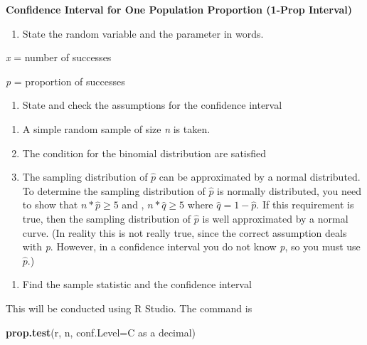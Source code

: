 \documentclass[
]{book}
\newenvironment{Shaded}{\begin{snugshade}}{\end{snugshade}}
\newcommand{\DataTypeTok}[1]{\textcolor[rgb]{0.13,0.29,0.53}{#1}}
\newcommand{\KeywordTok}[1]{\textcolor[rgb]{0.13,0.29,0.53}{\textbf{#1}}}
\newcommand{\NormalTok}[1]{#1}
\providecommand{\tightlist}{%
  \setlength{\itemsep}{0pt}\setlength{\parskip}{0pt}}
\begin{document}
\textbf{Confidence Interval for One Population Proportion (1-Prop Interval)}

\begin{enumerate}
\def\labelenumi{\arabic{enumi}.}
\tightlist
\item
  State the random variable and the parameter in words.
\end{enumerate}

\emph{x} = number of successes

\emph{p} = proportion of successes

\begin{enumerate}
\def\labelenumi{\arabic{enumi}.}
\setcounter{enumi}{1}
\tightlist
\item
  State and check the assumptions for the confidence interval
\end{enumerate}

\begin{enumerate}
\def\labelenumi{\alph{enumi}.}
\item
  A simple random sample of size \emph{n} is taken.
\item
  The condition for the binomial distribution are satisfied
\item
  The sampling distribution of \(\hat{p}\) can be approximated by a normal distributed. To determine the sampling distribution of \(\hat{p}\) is normally distributed, you need to show that \(n*\hat{p}\ge5\) and , \(n*\hat{q}\ge5\) where \(\hat{q}=1-\hat{p}\). If this requirement is true, then the sampling distribution of \(\hat{p}\) is well approximated by a normal curve. (In reality this is not really true, since the correct assumption deals with \emph{p}. However, in a confidence interval you do not know \emph{p}, so you must use \(\hat{p}\).)
\end{enumerate}

\begin{enumerate}
\def\labelenumi{\arabic{enumi}.}
\setcounter{enumi}{2}
\tightlist
\item
  Find the sample statistic and the confidence interval
\end{enumerate}

This will be conducted using R Studio. The command is

\begin{Shaded}
\begin{Highlighting}[]
\KeywordTok{prop.test}\NormalTok{(r, n, }\DataTypeTok{conf.Level=}\NormalTok{C as a decimal)}
\end{Highlighting}
\end{Shaded}
\end{document}
